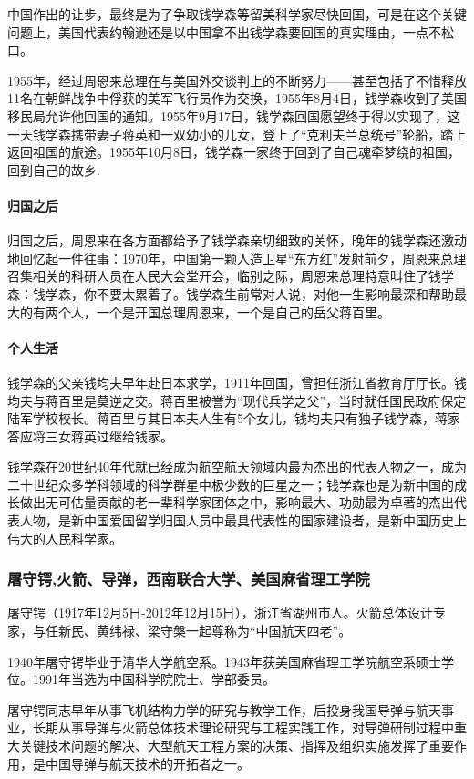 \documentclass[UTF8]{ctexart}
\begin{document}
中国作出的让步，最终是为了争取钱学森等留美科学家尽快回国，可是在这个关键问题上，美国代表约翰逊还是以中国拿不出钱学森要回国的真实理由，一点不松口。

1955年，经过周恩来总理在与美国外交谈判上的不断努力——甚至包括了不惜释放11名在朝鲜战争中俘获的美军飞行员作为交换，1955年8月4日，钱学森收到了美国移民局允许他回国的通知。1955年9月17日，钱学森回国愿望终于得以实现了，这一天钱学森携带妻子蒋英和一双幼小的儿女，登上了“克利夫兰总统号”轮船，踏上返回祖国的旅途。1955年10月8日，钱学森一家终于回到了自己魂牵梦绕的祖国，回到自己的故乡.

\paragraph{归国之后}
归国之后，周恩来在各方面都给予了钱学森亲切细致的关怀，晚年的钱学森还激动地回忆起一件往事：1970年，中国第一颗人造卫星“东方红”发射前夕，周恩来总理召集相关的科研人员在人民大会堂开会，临别之际，周恩来总理特意叫住了钱学森：钱学森，你不要太累着了。钱学森生前常对人说，对他一生影响最深和帮助最大的有两个人，一个是开国总理周恩来，一个是自己的岳父蒋百里。

\paragraph{个人生活}
钱学森的父亲钱均夫早年赴日本求学，1911年回国，曾担任浙江省教育厅厅长。钱均夫与蒋百里是莫逆之交。蒋百里被誉为“现代兵学之父”，当时就任国民政府保定陆军学校校长。蒋百里与其日本夫人生有5个女儿，钱均夫只有独子钱学森，蒋家答应将三女蒋英过继给钱家。

钱学森在20世纪40年代就已经成为航空航天领域内最为杰出的代表人物之一，成为二十世纪众多学科领域的科学群星中极少数的巨星之一；钱学森也是为新中国的成长做出无可估量贡献的老一辈科学家团体之中，影响最大、功勋最为卓著的杰出代表人物，是新中国爱国留学归国人员中最具代表性的国家建设者，是新中国历史上伟大的人民科学家。

    \subsubsection{屠守锷,火箭、导弹，西南联合大学、美国麻省理工学院}
屠守锷（1917年12月5日-2012年12月15日），浙江省湖州市人。火箭总体设计专家，与任新民、黄纬禄、梁守槃一起尊称为“中国航天四老”。

1940年屠守锷毕业于清华大学航空系。1943年获美国麻省理工学院航空系硕士学位。1991年当选为中国科学院院士、学部委员。

屠守锷同志早年从事飞机结构力学的研究与教学工作，后投身我国导弹与航天事业，长期从事导弹与火箭总体技术理论研究与工程实践工作，对导弹研制过程中重大关键技术问题的解决、大型航天工程方案的决策、指挥及组织实施发挥了重要作用，是中国导弹与航天技术的开拓者之一。
\end{document}
